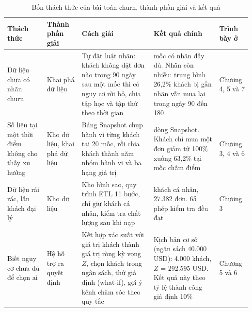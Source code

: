 \begin{table}[!htbp]
\centering
\caption{Bốn thách thức của bài toán churn, thành phần giải và kết quả}
\label{tab:giaithachthuc}
\footnotesize
\renewcommand{\arraystretch}{1.05}
\begin{tabular}{>{\raggedright\arraybackslash}p{2.4cm}>{\raggedright\arraybackslash}p{1.7cm}>{\raggedright\arraybackslash}p{4.3cm}>{\raggedright\arraybackslash}p{3.9cm}>{\raggedright\arraybackslash}p{1.5cm}}
\toprule
Thách thức & Thành phần giải & Cách giải & Kết quả chính & Trình bày ở \\
\midrule
Dữ liệu chưa có nhãn churn & Khai phá dữ liệu & Tự đặt luật nhãn: khách không đặt đơn nào trong 90 ngày sau một mốc thì có nguy cơ rời bỏ, chia tập học và tập thử theo thời gian & 19 mốc có nhãn đầy đủ. Nhãn còn nhiễu: trung bình 26,2\% khách bị gắn nhãn vẫn mua lại trong ngày 90 đến 180 & Chương 4, 5 và 7 \\
Số liệu tại một thời điểm không cho thấy xu hướng & Kho dữ liệu, khai phá dữ liệu & Bảng Snapshot chụp hành vi từng khách tại 20 mốc, rồi chia khách thành năm nhóm hành vi và ba hạng giá trị & 196.985 dòng Snapshot. Khách chỉ mua một đơn giảm từ 100\% xuống 63,2\% tại mốc chấm điểm & Chương 3, 4 và 6 \\
Dữ liệu rải rác, lẫn khách đại lý & Kho dữ liệu & Kho hình sao, quy trình ETL 11 bước, chỉ giữ khách cá nhân, kiểm tra chất lượng sau khi nạp & 18.484 khách cá nhân, 27.382 đơn. 65 phép kiểm tra đều đạt & Chương 3 \\
Biết nguy cơ chưa đủ để chọn ai & Hệ hỗ trợ ra quyết định & Kết hợp xác suất với giá trị khách thành giá trị ròng kỳ vọng $Z$, chọn khách trong ngân sách, thử giả định (what-if), gợi ý kênh chăm sóc theo quy tắc & Kịch bản cơ sở (ngân sách 40.000 USD): 4.000 khách, $Z$ = 292.595 USD. Kết quả này theo tỷ lệ thành công giả định 10\% & Chương 5 và 6 \\
\bottomrule
\end{tabular}
\end{table}

